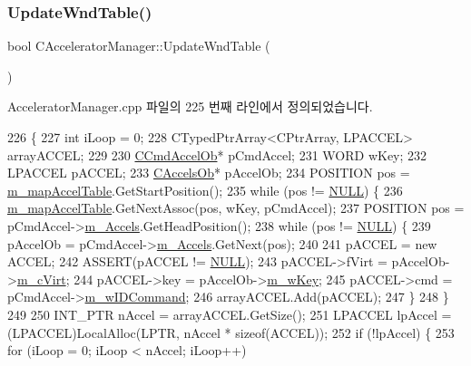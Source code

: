 \subsubsection{\texorpdfstring{Update\+Wnd\+Table()}{UpdateWndTable()}}
{\footnotesize\ttfamily bool C\+Accelerator\+Manager\+::\+Update\+Wnd\+Table (\begin{DoxyParamCaption}{ }\end{DoxyParamCaption})}



Accelerator\+Manager.\+cpp 파일의 225 번째 라인에서 정의되었습니다.


\begin{DoxyCode}
226 \{
227   \textcolor{keywordtype}{int} iLoop = 0;
228   CTypedPtrArray<CPtrArray, LPACCEL> arrayACCEL;
229 
230   \mbox{\hyperlink{class_c_cmd_accel_ob}{CCmdAccelOb}}* pCmdAccel;
231   WORD wKey;
232   LPACCEL pACCEL;
233   \mbox{\hyperlink{class_c_accels_ob}{CAccelsOb}}* pAccelOb;
234   POSITION pos = \mbox{\hyperlink{class_c_accelerator_manager_a16b8d3e9328bc0eeeb048630deff2768}{m\_mapAccelTable}}.GetStartPosition();
235   \textcolor{keywordflow}{while} (pos != \mbox{\hyperlink{getopt1_8c_a070d2ce7b6bb7e5c05602aa8c308d0c4}{NULL}}) \{
236     \mbox{\hyperlink{class_c_accelerator_manager_a16b8d3e9328bc0eeeb048630deff2768}{m\_mapAccelTable}}.GetNextAssoc(pos, wKey, pCmdAccel);
237     POSITION pos = pCmdAccel->\mbox{\hyperlink{class_c_cmd_accel_ob_a85772f1ea9204af42b8a39a0135dc0f8}{m\_Accels}}.GetHeadPosition();
238     \textcolor{keywordflow}{while} (pos != \mbox{\hyperlink{getopt1_8c_a070d2ce7b6bb7e5c05602aa8c308d0c4}{NULL}}) \{
239       pAccelOb = pCmdAccel->\mbox{\hyperlink{class_c_cmd_accel_ob_a85772f1ea9204af42b8a39a0135dc0f8}{m\_Accels}}.GetNext(pos);
240 
241       pACCEL = \textcolor{keyword}{new} ACCEL;
242       ASSERT(pACCEL != \mbox{\hyperlink{getopt1_8c_a070d2ce7b6bb7e5c05602aa8c308d0c4}{NULL}});
243       pACCEL->fVirt = pAccelOb->\mbox{\hyperlink{class_c_accels_ob_a08b7003ccf92c6afcf31878960d8eee1}{m\_cVirt}};
244       pACCEL->key = pAccelOb->\mbox{\hyperlink{class_c_accels_ob_a1891250e9a4d00c0862f3a90a965d635}{m\_wKey}};
245       pACCEL->cmd = pCmdAccel->\mbox{\hyperlink{class_c_cmd_accel_ob_aa3eb02dcd39ff14763fdefd8fabd7591}{m\_wIDCommand}};
246       arrayACCEL.Add(pACCEL);
247     \}
248   \}
249   
250   INT\_PTR nAccel = arrayACCEL.GetSize();
251   LPACCEL lpAccel = (LPACCEL)LocalAlloc(LPTR, nAccel * \textcolor{keyword}{sizeof}(ACCEL));
252   \textcolor{keywordflow}{if} (!lpAccel) \{
253     \textcolor{keywordflow}{for} (iLoop = 0; iLoop < nAccel; iLoop++)

\end{DoxyCode}
